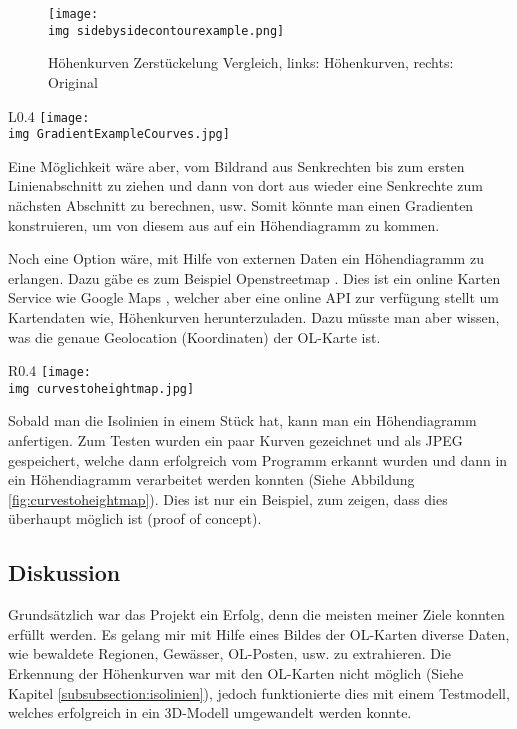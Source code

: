 \newpage

\begin{figure}[hbt]
	\centering
	\texttt{[image: \\img sidebysidecontourexample.png]}
	\caption{Höhenkurven Zerstückelung Vergleich, links: Höhenkurven, rechts: Original}
	\label{fig:courvecompare}
\end{figure}

\begin{wrapfigure}{L}{0.4\textwidth}
	\centering
	\texttt{[image: \\img GradientExampleCourves.jpg]}
	\caption{Gradienten Lösungsansatz}
	\label{fig:gradientexample}
\end{wrapfigure}

Eine Möglichkeit wäre aber, vom Bildrand aus Senkrechten bis zum ersten Linienabschnitt zu ziehen und dann von dort aus wieder eine Senkrechte zum nächsten Abschnitt zu berechnen, usw. Somit könnte man einen Gradienten konstruieren, um von diesem aus auf ein Höhendiagramm zu kommen.

Noch eine Option wäre, mit Hilfe von externen Daten ein Höhendiagramm zu erlangen. Dazu gäbe es zum Beispiel Openstreetmap \cite{openstreetmap:1}. Dies ist ein online Karten Service wie Google Maps  \cite{googlemaps:1}, welcher aber eine online API zur verfügung stellt um Kartendaten wie, Höhenkurven herunterzuladen. Dazu müsste man aber wissen, was die genaue Geolocation (Koordinaten) der OL-Karte ist.


\begin{wrapfigure}[9]{R}{0.4\textwidth}
	\centering
	\texttt{[image: \\img curvestoheightmap.jpg]}
	\caption{Höhendiagramm aus Höhenkurven}
	\label{fig:curvestoheightmap}
\end{wrapfigure}

\newpage

Sobald man die Isolinien in einem Stück hat, kann man ein Höhendiagramm anfertigen. Zum Testen wurden ein paar Kurven gezeichnet und als JPEG gespeichert, welche dann erfolgreich vom Programm erkannt wurden und dann in ein Höhendiagramm verarbeitet werden konnten (Siehe Abbildung \ref{fig:curvestoheightmap}). Dies ist nur ein Beispiel, zum zeigen, dass dies überhaupt möglich ist (proof of concept).

\newpage

\subsection{Diskussion}

Grundsätzlich war das Projekt ein Erfolg, denn die meisten meiner Ziele konnten erfüllt werden. Es gelang mir mit Hilfe eines Bildes der OL-Karten diverse Daten, wie bewaldete Regionen, Gewässer, OL-Posten, usw. zu extrahieren. Die Erkennung der Höhenkurven war mit den OL-Karten nicht möglich (Siehe Kapitel \ref{subsubsection:isolinien}), jedoch funktionierte dies  mit einem Testmodell, welches erfolgreich in ein 3D-Modell umgewandelt werden konnte.

